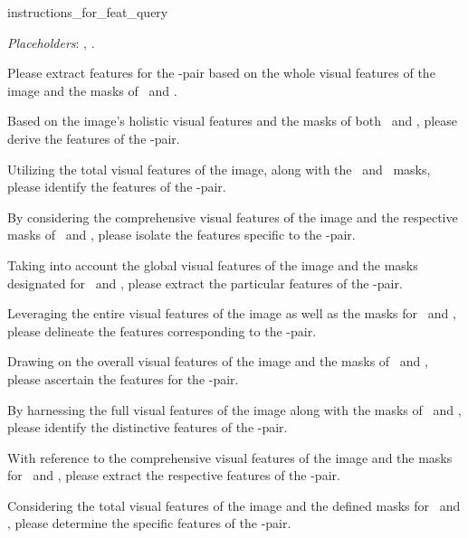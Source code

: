 \begin{instructionbox}{instructions\_for\_feat\_query}
\small
\raggedright
\noindent \textit{Placeholders}: \instsubject, \instobject.
\begin{instructionitems}
\item Please extract features for the \instsubject-\instobject pair based on the whole visual features of the image and the masks of \instsubject\ and \instobject.
\item Based on the image's holistic visual features and the masks of both \instsubject\ and \instobject, please derive the features of the \instsubject-\instobject pair.
\item Utilizing the total visual features of the image, along with the \instsubject\ and \instobject\ masks, please identify the features of the \instsubject-\instobject pair.
\item By considering the comprehensive visual features of the image and the respective masks of \instsubject\ and \instobject, please isolate the features specific to the \instsubject-\instobject pair.
\item Taking into account the global visual features of the image and the masks designated for \instsubject\ and \instobject, please extract the particular features of the \instsubject-\instobject pair.
\item Leveraging the entire visual features of the image as well as the masks for \instsubject\ and \instobject, please delineate the features corresponding to the \instsubject-\instobject pair.
\item Drawing on the overall visual features of the image and the masks of \instsubject\ and \instobject, please ascertain the features for the \instsubject-\instobject pair.
\item By harnessing the full visual features of the image along with the masks of \instsubject\ and \instobject, please identify the distinctive features of the \instsubject-\instobject pair.
\item With reference to the comprehensive visual features of the image and the masks for \instsubject\ and \instobject, please extract the respective features of the \instsubject-\instobject pair.
\item Considering the total visual features of the image and the defined masks for \instsubject\ and \instobject, please determine the specific features of the \instsubject-\instobject pair.
\end{instructionitems}
\end{instructionbox}

